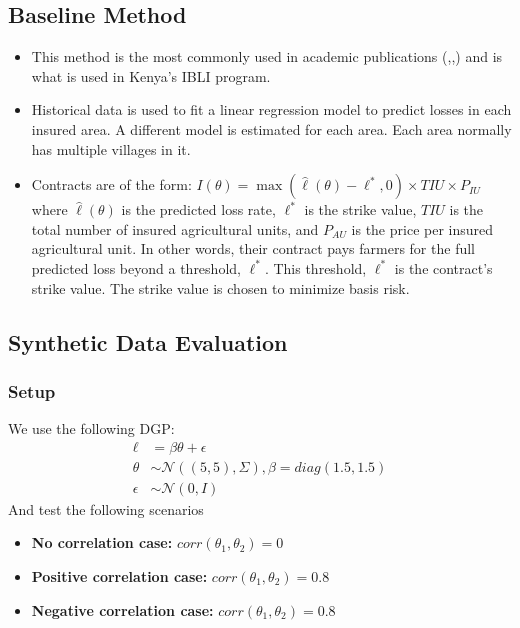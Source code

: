 \documentclass[11pt]{article}
\begin{document}
  \subsection{Baseline Method}
    \begin{itemize}
        \item This method is the most commonly used in academic publications (\cite{chantarat2013designing},\cite{flatnes2018improving},\cite{jensen2019does}) and is what is used in Kenya's IBLI program. 
        \item Historical data is used to fit a linear regression model to predict losses in each insured area. A different model is estimated for each area. Each area normally has multiple villages in it. 
        \item Contracts are of the form: $I(\theta) = \max(\hat{\ell}(\theta)-\ell^*,0)\times TIU \times P_{IU}$ where $\hat{\ell}(\theta)$ is the predicted loss rate, $\ell^*$ is the strike value, $TIU$ is the total number of insured agricultural units, and $P_{AU}$ is the price per insured agricultural unit.  In other words, their contract pays farmers for the full predicted loss beyond a threshold, $\ell^*$. This threshold, $\ell^*$ is the contract's strike value. The strike value is chosen to minimize basis risk.
    \end{itemize}

  \subsection{Synthetic Data Evaluation}
    \subsubsection{Setup}
      We use the following DGP:
      \begin{align*}
        \ell &= \beta \theta + \epsilon\\
        \theta &\sim \mathcal{N}((5,5),\Sigma), \beta = diag(1.5,1.5)\\
        \epsilon &\sim \mathcal{N}(0,I)
      \end{align*}
      And test the following scenarios
      \begin{itemize}
          \item \textbf{No correlation case:} $corr(\theta_1,\theta_2) = 0$
          \item \textbf{Positive correlation case:} $corr(\theta_1,\theta_2) = 0.8$
          \item \textbf{Negative correlation case:} $corr(\theta_1,\theta_2) = 0.8$
      \end{itemize}
\end{document}
